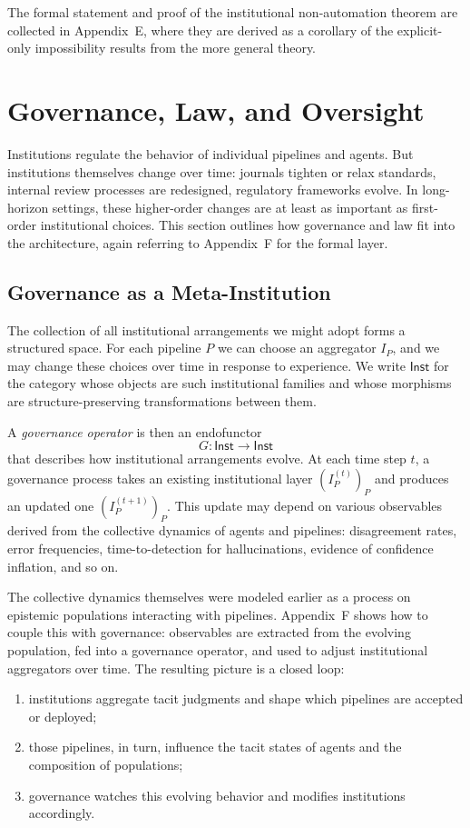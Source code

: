 \documentclass[11pt]{article}
\theoremstyle{definition}
\newcommand{\Inst}{\mathsf{Inst}}
\begin{document}
The formal statement and proof of the institutional non-automation theorem are collected in Appendix~E, where they are derived as a corollary of the explicit-only impossibility results from the more general theory.

\section{Governance, Law, and Oversight}
\label{sec:governance-main}

Institutions regulate the behavior of individual pipelines and agents. But institutions themselves change over time: journals tighten or relax standards, internal review processes are redesigned, regulatory frameworks evolve. In long-horizon settings, these higher-order changes are at least as important as first-order institutional choices. This section outlines how governance and law fit into the architecture, again referring to Appendix~F for the formal layer.

\subsection{Governance as a Meta-Institution}

The collection of all institutional arrangements we might adopt forms a structured space. For each pipeline $P$ we can choose an aggregator $I_P$, and we may change these choices over time in response to experience. We write $\Inst$ for the category whose objects are such institutional families and whose morphisms are structure-preserving transformations between them.

A \emph{governance operator} is then an endofunctor
\[
  G : \Inst \to \Inst
\]
that describes how institutional arrangements evolve. At each time step $t$, a governance process takes an existing institutional layer $(I^{(t)}_P)_P$ and produces an updated one $(I^{(t+1)}_P)_P$. This update may depend on various observables derived from the collective dynamics of agents and pipelines: disagreement rates, error frequencies, time-to-detection for hallucinations, evidence of confidence inflation, and so on.

The collective dynamics themselves were modeled earlier as a process on epistemic populations interacting with pipelines. Appendix~F shows how to couple this with governance: observables are extracted from the evolving population, fed into a governance operator, and used to adjust institutional aggregators over time. The resulting picture is a closed loop:
\begin{enumerate}
  \item institutions aggregate tacit judgments and shape which pipelines are accepted or deployed;
  \item those pipelines, in turn, influence the tacit states of agents and the composition of populations;
  \item governance watches this evolving behavior and modifies institutions accordingly.
\end{enumerate}
\end{document}
